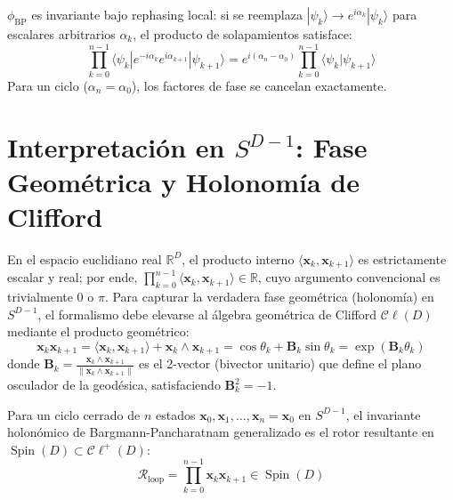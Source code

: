 \begin{theorem}
$\phi_{\text{BP}}$ es invariante bajo rephasing local: si se reemplaza
$|\psi_k\rangle \to e^{i\alpha_k}|\psi_k\rangle$ para escalares arbitrarios
$\alpha_k$, el producto de solapamientos satisface:
\begin{equation}
\prod_{k=0}^{n-1} \langle\psi_k| e^{-i\alpha_k} e^{i\alpha_{k+1}} |\psi_{k+1}\rangle = e^{i(\alpha_{n} - \alpha_0)} \prod_{k=0}^{n-1} \langle\psi_k|\psi_{k+1}\rangle
\end{equation}
Para un ciclo ($\alpha_n = \alpha_0$), los factores de fase se cancelan exactamente.
\end{theorem}

\section{Interpretación en $S^{D-1}$: Fase Geométrica y Holonomía de Clifford}

En el espacio euclidiano real $\mathbb{R}^D$, el producto interno $\langle \mathbf{x}_k, \mathbf{x}_{k+1} \rangle$ es estrictamente escalar y real; por ende, $\prod_{k=0}^{n-1} \langle \mathbf{x}_k, \mathbf{x}_{k+1} \rangle \in \mathbb{R}$, cuyo argumento convencional es trivialmente $0$ o $\pi$. Para capturar la verdadera fase geométrica (holonomía) en $S^{D-1}$, el formalismo debe elevarse al álgebra geométrica de Clifford $\mathcal{C}\ell(D)$ mediante el producto geométrico:
\begin{equation}
\mathbf{x}_k \mathbf{x}_{k+1} = \langle \mathbf{x}_k, \mathbf{x}_{k+1} \rangle + \mathbf{x}_k \wedge \mathbf{x}_{k+1} = \cos\theta_k + \mathbf{B}_k \sin\theta_k = \exp(\mathbf{B}_k \theta_k)
\end{equation}
donde $\mathbf{B}_k = \frac{\mathbf{x}_k \wedge \mathbf{x}_{k+1}}{\|\mathbf{x}_k \wedge \mathbf{x}_{k+1}\|}$ es el 2-vector (bivector unitario) que define el plano osculador de la geodésica, satisfaciendo $\mathbf{B}_k^2 = -1$.

Para un ciclo cerrado de $n$ estados $\mathbf{x}_0, \mathbf{x}_1, \dots, \mathbf{x}_n = \mathbf{x}_0$ en $S^{D-1}$, el invariante holonómico de Bargmann-Pancharatnam generalizado es el rotor resultante en $\operatorname{Spin}(D) \subset \mathcal{C}\ell^+(D)$:
\begin{equation}
\mathcal{R}_{\text{loop}} = \prod_{k=0}^{n-1} \mathbf{x}_k \mathbf{x}_{k+1} \in \operatorname{Spin}(D)
\label{eq:bp_clifford}
\end{equation}

